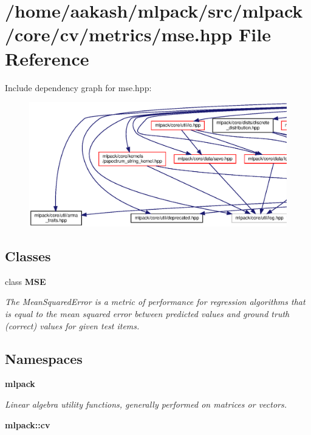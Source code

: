\section{/home/aakash/mlpack/src/mlpack/core/cv/metrics/mse.hpp File Reference}
\label{mse_8hpp}
Include dependency graph for mse.\+hpp\+:
\nopagebreak
\begin{figure}[H]
\begin{center}
\leavevmode
\includegraphics[width=350pt]{mse_8hpp__incl}
\end{center}
\end{figure}
\subsection*{Classes}
\begin{DoxyCompactItemize}
\item 
class \textbf{ M\+SE}
\begin{DoxyCompactList}\small\item\em The Mean\+Squared\+Error is a metric of performance for regression algorithms that is equal to the mean squared error between predicted values and ground truth (correct) values for given test items. \end{DoxyCompactList}\end{DoxyCompactItemize}
\subsection*{Namespaces}
\begin{DoxyCompactItemize}
\item 
 \textbf{ mlpack}
\begin{DoxyCompactList}\small\item\em Linear algebra utility functions, generally performed on matrices or vectors. \end{DoxyCompactList}\item 
 \textbf{ mlpack\+::cv}
\end{DoxyCompactItemize}


